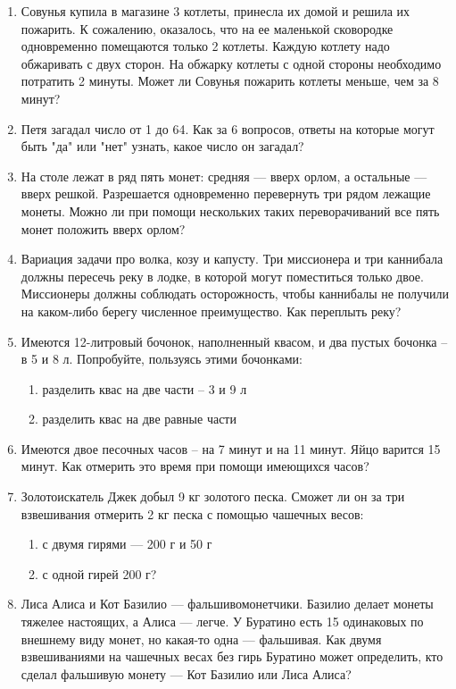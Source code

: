 \documentclass[a4paper,12pt]{article}
\begin{document}
    \begin{enumerate}
    \item Совунья купила в магазине 3 котлеты, принесла их домой и решила их пожарить. К сожалению, оказалось, что на ее маленькой сковородке одновременно помещаются только 2 котлеты. Каждую котлету надо обжаривать с двух сторон. На обжарку котлеты с одной стороны необходимо потратить 2 минуты. Может ли Совунья пожарить котлеты меньше, чем за 8 минут?
    \item Петя загадал число от 1 до 64. Как за 6 вопросов, ответы на которые могут быть "да" или "нет" узнать, какое число он загадал?
    \item На столе лежат в ряд пять монет: средняя  — вверх орлом, а остальные  — вверх решкой. Разрешается одновременно перевернуть три рядом лежащие монеты. Можно ли при помощи нескольких таких переворачиваний все пять монет положить вверх орлом?
    \item Вариация задачи про волка, козу и капусту. Три миссионера и три каннибала должны пересечь реку в лодке, в которой могут поместиться только двое. Миссионеры должны соблюдать осторожность, чтобы каннибалы не получили на каком-либо берегу численное преимущество. Как переплыть реку?
    \item Имеются 12-литровый бочонок, наполненный квасом, и два пустых бочонка – в 5 и 8 л. Попробуйте, пользуясь этими бочонками:
    \begin{enumerate}
        \item разделить квас на две части – 3 и 9 л
        \item разделить квас на две равные части
    \end{enumerate}
    \item Имеются двое песочных часов – на 7 минут и на 11 минут. Яйцо варится 15 минут. Как отмерить это время при помощи имеющихся часов?
    \item Золотоискатель Джек добыл 9 кг золотого песка. Сможет ли он за три взвешивания отмерить 2 кг песка с помощью чашечных весов: 
    \begin{enumerate}
        \item с двумя гирями  — 200 г и 50 г
        \item с одной гирей 200 г?
    \end{enumerate}
    \item Лиса Алиса и Кот Базилио  — фальшивомонетчики. Базилио делает монеты тяжелее настоящих, а Алиса  — легче. У Буратино есть 15 одинаковых по внешнему виду монет, но какая-то одна  — фальшивая. Как двумя взвешиваниями на чашечных весах без гирь Буратино может определить, кто сделал фальшивую монету  — Кот Базилио или Лиса Алиса?

\end{enumerate}
\end{document}
